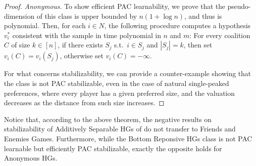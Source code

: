 \documentclass[letterpaper]{article} %
\newcommand{\proofpart}[1]{%
  \par
  \addvspace{\smallskipamount}%
  \noindent\emph{#1} \hspace{2pt}
}
\begin{document}
\begin{proof}
\proofpart{Anonymous.}To show efficient PAC learnability, we prove that the pseudo-dimension of this class is upper bounded by $n (1+\log n)$, and thus is polynomial. Then, for each $i \in N$, the following procedure computes a hypothesis $v_i^*$ consistent with the sample in time polynomial in $n$ and $m$: For every coalition $C$ of size $k\in[n]$, if there exists $S_j$ s.t.\ $i\in S_j$ and $|S_j|=k$, then set $v_i(C)=v_i(S_j)$, otherwise set $v_i(C)=-\infty$.

For what concerns stabilizability, we can provide a counter-example showing that the class is not PAC stabilizable, even in the case of natural single-peaked preferences, where every player has a given preferred size, and the valuation decreases as the distance from such size increases.
\end{proof}

Notice that, according to the above theorem, the negative results on stabilizability of Additively Separable HGs of \cite{SliwinskiZ17} do not transfer to Friends and Enemies Games.
Furthermore, while the Bottom Reponsive HGs class is not PAC learnable but efficiently PAC stabilizable, exactly the opposite holds for Anonymous HGs.
\end{document}
